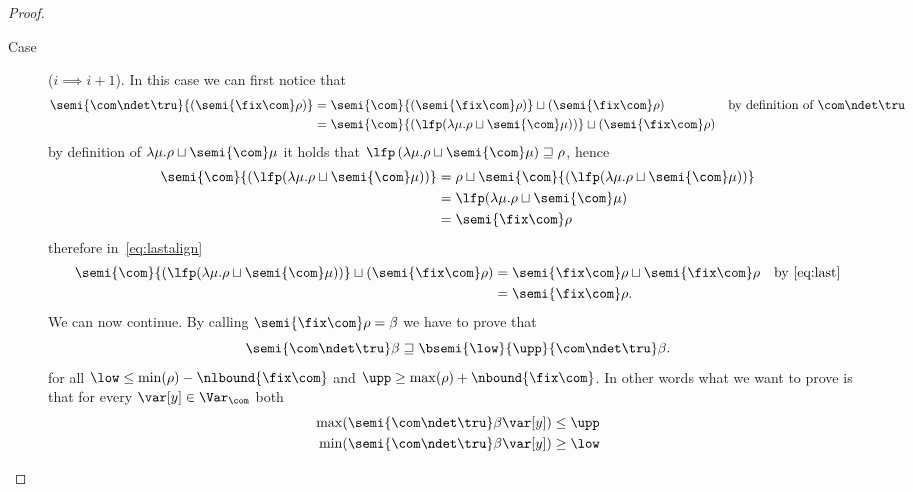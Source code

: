 \begin{proof}
\begin{inductive}
\begin{description}
    \item[Case] (\(i \implies i+1\)). In this case we can first
      notice that
      \begin{align}
        \semi{\com\ndet\tru}{\left(\semi{\fix\com}\rho\right)} & = \semi{\com}{\left(\semi{\fix\com}\rho\right)} \sqcup {\left(\semi{\fix\com}\rho\right)} & \text{by definition of } \com\ndet\tru \nonumber \\
                                                                             & = \semi{\com}{\left(\lfp(\lambda \mu . \rho \sqcup \semi{\com}\mu )\right)} \sqcup \left(\semi{\fix\com}\rho\right) \label{eq:lastalign}
      \end{align}
      by definition of
      \(\lambda \mu . \rho \sqcup \semi{\com}\mu\) it holds
      that
      \(\lfp\left(\lambda \mu . \rho \sqcup
        \semi{\com}\mu\right)\sqsupseteq \rho\), hence
      \begin{align}
        \semi{\com}{\left(\lfp(\lambda \mu . \rho \sqcup \semi{\com}\mu )\right)} & = \rho \sqcup \semi{\com}{\left(\lfp(\lambda \mu . \rho \sqcup \semi{\com}\mu )\right)} \nonumber\\
                                                                                                & = {\lfp(\lambda \mu . \rho \sqcup \semi{\com}\mu )} \nonumber \\
                                                                                                & = \semi{\fix\com}\rho \label{eq:last}
      \end{align}
      therefore in~\eqref{eq:lastalign}
      \begin{align*}
        \semi{\com}{\left(\lfp(\lambda \mu . \rho \sqcup \semi{\com}\mu )\right)} \sqcup \left(\semi{\fix\com}\rho\right)
        & = \semi{\fix\com}\rho \sqcup \semi{\fix\com}\rho & \text{by~\eqref{eq:last}}\\
        & = \semi{\fix\com}\rho.
      \end{align*}
      We can now continue. By calling
      \(\semi{\fix\com}\rho = \beta\) we have to prove that
      \begin{equation}\label{eq:boundless}
        \semi{\com\ndet\tru}\beta \sqsupseteq \bsemi{\low}{\upp}{\com\ndet\tru}\beta.
      \end{equation}
      for all \(\low \leq \min(\rho) - \nlbound{\fix\com}\) and
      \(\upp \geq \max(\rho) + \nbound{\fix\com}\). In other words what
      we want to prove is that for every \(\var[y] \in \Var_{\com}\)
      both
      \begin{align*}
        \max(\semi{\com\ndet\tru}\beta\var[y]) & \leq \upp \\
        \min(\semi{\com\ndet\tru}\beta\var[y]) & \geq \low
      \end{align*}


\end{description}
\end{inductive}
\end{proof}
